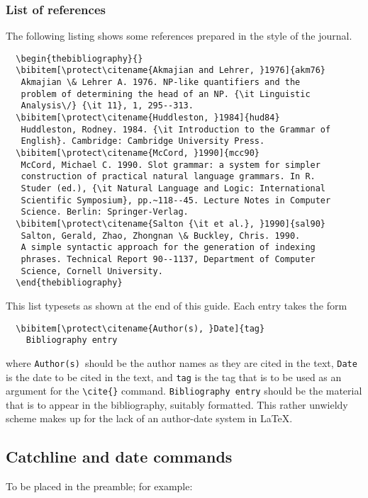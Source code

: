 \documentclass{tlp}
\begin{document}
\subsubsection{List of references}\label{fullref}

The following listing shows some references prepared in the style of the
journal.
%
{\fontsize{7}{9}\selectfont
\begin{verbatim}
  \begin{thebibliography}{}
  \bibitem[\protect\citename{Akmajian and Lehrer, }1976]{akm76}
   Akmajian \& Lehrer A. 1976. NP-like quantifiers and the
   problem of determining the head of an NP. {\it Linguistic
   Analysis\/} {\it 11}, 1, 295--313.
  \bibitem[\protect\citename{Huddleston, }1984]{hud84}
   Huddleston, Rodney. 1984. {\it Introduction to the Grammar of
   English}. Cambridge: Cambridge University Press.
  \bibitem[\protect\citename{McCord, }1990]{mcc90}
   McCord, Michael C. 1990. Slot grammar: a system for simpler
   construction of practical natural language grammars. In R.
   Studer (ed.), {\it Natural Language and Logic: International
   Scientific Symposium}, pp.~118--45. Lecture Notes in Computer
   Science. Berlin: Springer-Verlag.
  \bibitem[\protect\citename{Salton {\it et al.}, }1990]{sal90}
   Salton, Gerald, Zhao, Zhongnan \& Buckley, Chris. 1990.
   A simple syntactic approach for the generation of indexing
   phrases. Technical Report 90--1137, Department of Computer
   Science, Cornell University.
  \end{thebibliography}
\end{verbatim}}
%
This list typesets as shown at the end of this guide.
Each entry takes the form
%
\begin{verbatim}
  \bibitem[\protect\citename{Author(s), }Date]{tag}
    Bibliography entry
\end{verbatim}
%
where \verb"Author(s)"\ should be the author names as they are cited in
the text, \verb"Date" is the date to be cited in the text, and \verb"tag"
is the tag that is to be used as an argument for the \verb"\cite{}" command.
\verb"Bibliography entry" should be the
material that is to appear in the bibliography, suitably formatted.  This
rather unwieldy scheme makes up for the lack of an author-date system in
\LaTeX.

\subsection{Catchline and date commands}

To be placed in the preamble; for example:
\end{document}
